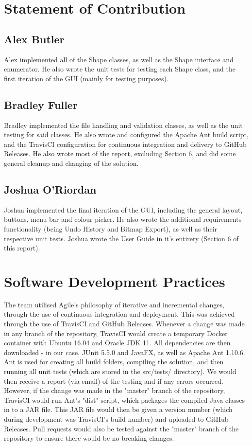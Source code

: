 \documentclass[12pt]{article} %
\begin{document}
\newpage

\section{Statement of Contribution}

\subsection{Alex Butler}
Alex implemented all of the Shape classes, as well as the Shape interface and enumerator. He also wrote the unit tests for testing each Shape class, and the first iteration of the GUI (mainly for testing purposes). 
\subsection{Bradley Fuller}
Bradley implemented the file handling and validation classes, as well as the unit testing for said classes. He also wrote and configured the Apache Ant build script, and the TravisCI configuration for continuous integration and delivery to GitHub Releases. He also wrote most of the report, excluding Section 6, and did some general cleanup and changing of the solution.
\subsection{Joshua O'Riordan}
Joshua implemented the final iteration of the GUI, including the general layout, buttons, menu bar and colour picker. He also wrote the additional requirements functionality (being Undo History and Bitmap Export), as well as their respective unit tests. Joshua wrote the User Guide in it's entirety (Section 6 of this report).

\newpage

\section{Software Development Practices}

The team utilised Agile's philosophy of iterative and incremental changes, through the use of continuous integration and deployment. This was achieved through the use of TravisCI and GitHub Releases. Whenever a change was made in any branch of the repository, TravisCI would create a temporary Docker container with Ubuntu 16.04 and Oracle JDK 11. All dependencies are then downloaded - in our case, JUnit 5.5.0 and JavaFX, as well as Apache Ant 1.10.6. Ant is used for creating all build folders, compiling the solution, and then running all unit tests (which are stored in the src/tests/ directory). We would then receive a report (via email) of the testing and if any errors occurred. However, if the change was made in the "master" branch of the repository, TravisCI would run Ant's "dist" script, which packages the compiled Java classes in to a JAR file. This JAR file would then be given a version number (which during development was TravisCI's build number) and uploaded to GitHub Releases. Pull requests would also be tested against the "master" branch of the repository to ensure there would be no breaking changes.
\end{document}
